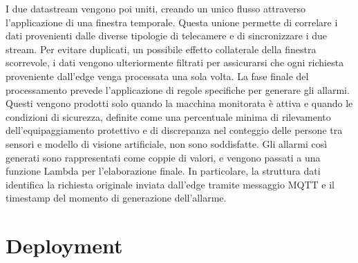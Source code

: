 I due datastream vengono poi uniti, creando un unico flusso attraverso l'applicazione di una finestra temporale. Questa unione permette di correlare i dati provenienti dalle diverse tipologie di telecamere e di sincronizzare i due stream. Per evitare duplicati, un possibile effetto collaterale della finestra scorrevole, i dati vengono ulteriormente filtrati per assicurarsi che ogni richiesta proveniente dall'edge venga processata una sola volta. La fase finale del processamento prevede l'applicazione di regole specifiche per generare gli allarmi. Questi vengono prodotti solo quando la macchina monitorata è attiva e quando le condizioni di sicurezza, definite come una percentuale minima di rilevamento dell'equipaggiamento protettivo e di discrepanza nel conteggio delle persone tra sensori e modello di visione artificiale, non sono soddisfatte. Gli allarmi così generati sono rappresentati come coppie di valori, e vengono passati a una funzione Lambda per l'elaborazione finale. In particolare, la struttura dati identifica la richiesta originale inviata dall'edge tramite messaggio MQTT e il timestamp del momento di generazione dell'allarme.



\section{Deployment}